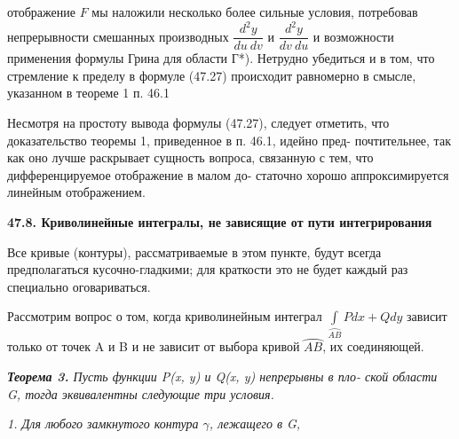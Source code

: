 \documentclass[10pt]{book}
\begin{document}
	
	\noindent отображение $F$ мы наложили несколько более сильные условия,\linebreak
	потребовав непрерывности смешанных производных $\dfrac{d^2y}{du \ dv}$ и $\dfrac{d^2y}{dv \ du}$ и\linebreak
	возможности применения формулы Грина для области {Г*}). Нетрудно \linebreak
	убедиться и в том, что стремление к пределу в формуле (47.27) \linebreak
	происходит равномерно в смысле, указанном в теореме 1 п. 46.1 \par
	
	Несмотря на простоту вывода формулы (47.27), следует отметить, \linebreak
		что доказательство теоремы 1, приведенное в п. 46.1, идейно пред- \linebreak
		почтительнее, так как оно лучше раскрывает сущность вопроса, \linebreak
		связанную с тем, что дифференцируемое отображение в малом до- \linebreak
		статочно хорошо аппроксимируется линейным отображением. \par
	\begin{center}
		{\textbf{47.8. Криволинейные интегралы, не зависящие \linebreak от пути интегрирования}}
	\end{center}	
	
	
	Все кривые (контуры), рассматриваемые в этом пункте,\linebreak
	будут всегда предполагаться кусочно-гладкими; для краткости это\linebreak
	не будет каждый раз специально оговариваться.\par
	
	Рассмотрим вопрос о том, когда криволинейным интеграл \linebreak
	$\int\limits_{\wideparen{AB}} P dx + Q dy$ зависит только от точек A и B и не зависит от выбора \linebreak
	кривой $\wideparen{AB}$, их соединяющей. \par 
	
	\textit{\textbf{Теорема 3.} Пусть функции P(x, y) и Q(x, y) непрерывны в пло-\linebreak 
	ской области G, тогда эквивалентны следующие три условия.} \par
	
		
	 \textit{1. Для любого замкнутого контура $\gamma$, лежащего в G,} \par 
	
\end{document}
